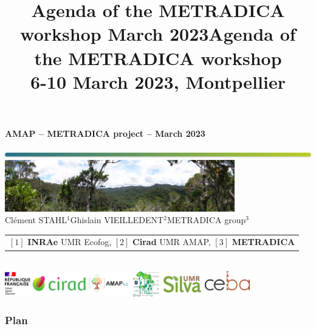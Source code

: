 \documentclass[10pt,table,dvipsnames,compress]{beamer}
\date{}
\title{Agenda of the METRADICA workshop March 2023}
\title[Metradica]{Agenda of the METRADICA workshop\\6-10 March 2023, Montpellier}
\newif\ifplacelogo %
\begin{document}
{
  \begin{frame}
  
  \begin{center}
  \small{\textbf{AMAP -- METRADICA project -- March 2023}}
  \end{center}
  \vspace{-1cm}
  \titlepage %
  \vspace{-3.5cm}
  \begin{center}
    \includegraphics[width=\textwidth]{figs/Barre_couleur}\\
    \vspace{0.5cm}
    \includegraphics[width=10cm]{figs/Banniere}\\
    \vspace{0.3cm}
    \small{Clément STAHL$^{1}$\hspace{0.25cm}Ghislain VIEILLEDENT$^{2}$\hspace{0.25cm}METRADICA group$^{3}$}\\
    \vspace{0.15cm}
    {\scriptsize
      \begin{tabular}{l}
        $[1]$ \textbf{INRAe} UMR Ecofog, $[2]$ \textbf{Cirad} UMR AMAP, $[3]$ \textbf{METRADICA}
      \end{tabular}
    }\\
    \vspace{0.3cm}
    \includegraphics[width=0.80\textwidth]{figs/partners_logos}
    
  \end{center}
  \end{frame}
}


\placelogotrue
\begin{frame}
  \frametitle{Plan}
  \begin{columns}[c]
    \begin{column}{0.5\textwidth}
      \tableofcontents[sections=1]
      \vspace{0.5cm}
      \tableofcontents[sections=2]
    \end{column}
    \begin{column}{0.5\textwidth}
        \tableofcontents[sections=3]
        \vspace{0.5cm}
        \tableofcontents[sections=4]
    \end{column}
  \end{columns}
\end{frame}
\placelogofalse
\end{document}
